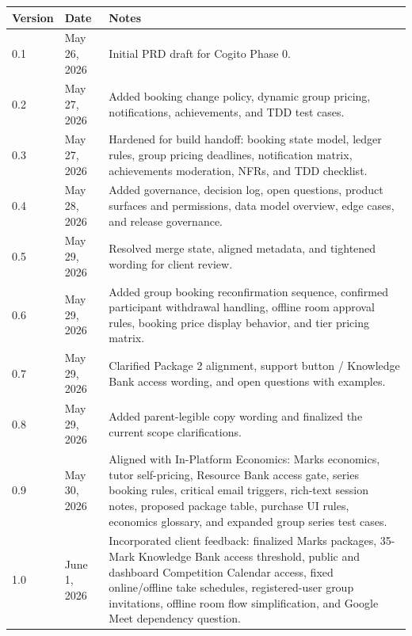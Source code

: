 \documentclass[11pt,a4paper]{article}
\begin{document}
\begin{tabular}{|p{3cm}|p{3cm}|p{8.2cm}|}
	\hline
	\textbf{Version} & \textbf{Date} & \textbf{Notes}                                                                                                                                                 \\
	\hline
	0.1              & May 26, 2026  & Initial PRD draft for Cogito Phase 0.                                                                                                                          \\
	\hline
	0.2              & May 27, 2026  & Added booking change policy, dynamic group pricing, notifications, achievements, and TDD test cases.                                                           \\
	\hline
	0.3              & May 27, 2026  & Hardened for build handoff: booking state model, ledger rules, group pricing deadlines, notification matrix, achievements moderation, NFRs, and TDD checklist. \\
	\hline
	0.4              & May 28, 2026  & Added governance, decision log, open questions, product surfaces and permissions, data model overview, edge cases, and release governance. \\
	\hline
	0.5              & May 29, 2026  & Resolved merge state, aligned metadata, and tightened wording for client review. \\
	\hline
	0.6              & May 29, 2026  & Added group booking reconfirmation sequence, confirmed participant withdrawal handling, offline room approval rules, booking price display behavior, and tier pricing matrix. \\
	\hline
	0.7              & May 29, 2026  & Clarified Package 2 alignment, support button / Knowledge Bank access wording, and open questions with examples. \\
	\hline
	0.8              & May 29, 2026  & Added parent-legible copy wording and finalized the current scope clarifications. \\
	\hline
	0.9              & May 30, 2026  & Aligned with In-Platform Economics: Marks economics, tutor self-pricing, Resource Bank access gate, series booking rules, critical email triggers, rich-text session notes, proposed package table, purchase UI rules, economics glossary, and expanded group series test cases. \\
	\hline
	1.0              & June 1, 2026  & Incorporated client feedback: finalized Marks packages, 35-Mark Knowledge Bank access threshold, public and dashboard Competition Calendar access, fixed online/offline take schedules, registered-user group invitations, offline room flow simplification, and Google Meet dependency question. \\

\end{tabular}
\end{document}
